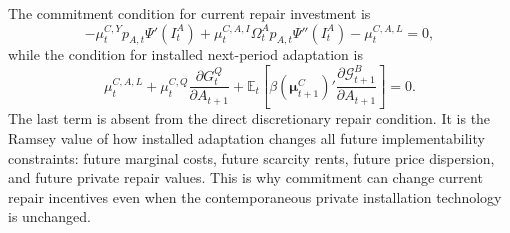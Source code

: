 ﻿\documentclass[12pt]{article}
\theoremstyle{remark}
\newcommand{\E}{\mathbb E}
\begin{document}
The commitment condition for current repair investment is
\begin{equation}
    -\mu_t^{C,Y}p_{A,t}\Psi'(I_t^A)
    +
    \mu_t^{C,A,I}\Omega_t^Ap_{A,t}\Psi''(I_t^A)
    -
    \mu_t^{C,A,L}
    =
    0,
    \label{eq:app_commitment_I}
\end{equation}
while the condition for installed next-period adaptation is
\begin{equation}
    \mu_t^{C,A,L}
    +
    \mu_t^{C,Q}
    \frac{\partial G_t^Q}{\partial A_{t+1}}
    +
    \E_t
    \left[
        \beta
        (\boldsymbol\mu_{t+1}^{C})'
        \frac{\partial \mathcal G_{t+1}^{B}}{\partial A_{t+1}}
    \right]
    =
    0.
    \label{eq:app_commitment_A_next}
\end{equation}
The last term is absent from the direct discretionary repair condition. It is the Ramsey value of
how installed adaptation changes all future implementability constraints: future marginal costs,
future scarcity rents, future price dispersion, and future private repair values. This is why
commitment can change current repair incentives even when the contemporaneous private installation
technology is unchanged.
\end{document}
